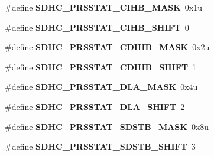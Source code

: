 \begin{DoxyCompactItemize}
\item 
\#define {\bfseries S\+D\+H\+C\+\_\+\+P\+R\+S\+S\+T\+A\+T\+\_\+\+C\+I\+H\+B\+\_\+\+M\+A\+SK}~0x1u\hypertarget{group__SDHC__Register__Masks_gaaba7df21329c057fa8906bcdffefb948}{}\label{group__SDHC__Register__Masks_gaaba7df21329c057fa8906bcdffefb948}

\item 
\#define {\bfseries S\+D\+H\+C\+\_\+\+P\+R\+S\+S\+T\+A\+T\+\_\+\+C\+I\+H\+B\+\_\+\+S\+H\+I\+FT}~0\hypertarget{group__SDHC__Register__Masks_ga104678507322e6937284cec9aabbe2ff}{}\label{group__SDHC__Register__Masks_ga104678507322e6937284cec9aabbe2ff}

\item 
\#define {\bfseries S\+D\+H\+C\+\_\+\+P\+R\+S\+S\+T\+A\+T\+\_\+\+C\+D\+I\+H\+B\+\_\+\+M\+A\+SK}~0x2u\hypertarget{group__SDHC__Register__Masks_ga41cd86790ec73a0f81fe4910f8e6b379}{}\label{group__SDHC__Register__Masks_ga41cd86790ec73a0f81fe4910f8e6b379}

\item 
\#define {\bfseries S\+D\+H\+C\+\_\+\+P\+R\+S\+S\+T\+A\+T\+\_\+\+C\+D\+I\+H\+B\+\_\+\+S\+H\+I\+FT}~1\hypertarget{group__SDHC__Register__Masks_gaebffc8f5a96e2405094e614d8ab72bc2}{}\label{group__SDHC__Register__Masks_gaebffc8f5a96e2405094e614d8ab72bc2}

\item 
\#define {\bfseries S\+D\+H\+C\+\_\+\+P\+R\+S\+S\+T\+A\+T\+\_\+\+D\+L\+A\+\_\+\+M\+A\+SK}~0x4u\hypertarget{group__SDHC__Register__Masks_ga609f9258fa078236470445ebfcd2e9ac}{}\label{group__SDHC__Register__Masks_ga609f9258fa078236470445ebfcd2e9ac}

\item 
\#define {\bfseries S\+D\+H\+C\+\_\+\+P\+R\+S\+S\+T\+A\+T\+\_\+\+D\+L\+A\+\_\+\+S\+H\+I\+FT}~2\hypertarget{group__SDHC__Register__Masks_gaad30094ca6309410952688acf6ed5f07}{}\label{group__SDHC__Register__Masks_gaad30094ca6309410952688acf6ed5f07}

\item 
\#define {\bfseries S\+D\+H\+C\+\_\+\+P\+R\+S\+S\+T\+A\+T\+\_\+\+S\+D\+S\+T\+B\+\_\+\+M\+A\+SK}~0x8u\hypertarget{group__SDHC__Register__Masks_ga45ba66986bd9e2c6419e1a4358b6a05e}{}\label{group__SDHC__Register__Masks_ga45ba66986bd9e2c6419e1a4358b6a05e}

\item 
\#define {\bfseries S\+D\+H\+C\+\_\+\+P\+R\+S\+S\+T\+A\+T\+\_\+\+S\+D\+S\+T\+B\+\_\+\+S\+H\+I\+FT}~3\hypertarget{group__SDHC__Register__Masks_ga4857c2040b9dc29336795fba391dd1ca}{}\label{group__SDHC__Register__Masks_ga4857c2040b9dc29336795fba391dd1ca}


\end{DoxyCompactItemize}
